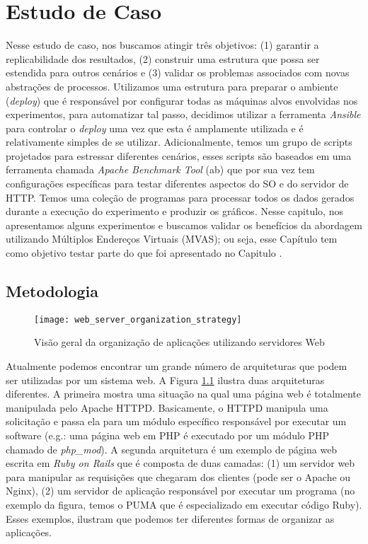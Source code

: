 \chapter{Estudo de Caso} \label{cap:estudo-de-caso}

Nesse estudo de caso, nos buscamos atingir três objetivos: (1) garantir a
replicabilidade dos resultados, (2) construir uma estrutura que possa ser
estendida para outros cenários e (3) validar os problemas associados com novas
abstrações de processos. Utilizamos uma estrutura para preparar o ambiente
(\emph{deploy}) que é responsável por configurar todas as máquinas alvos
envolvidas nos experimentos, para automatizar tal passo, decidimos utilizar a
ferramenta \emph{Ansible} para controlar o \emph{deploy} uma vez que esta é
amplamente utilizada e é relativamente simples de se utilizar. Adicionalmente,
temos um grupo de scripts projetados para estressar diferentes cenários, esses
scripts são baseados em uma ferramenta chamada \emph{Apache Benchmark Tool}
(ab) que por sua vez tem configurações específicas para testar diferentes
aspectos do SO e do servidor de HTTP. Temos uma coleção de programas para
processar todos os dados gerados durante a execução do experimento e produzir
os gráficos. Nesse capitulo, nos apresentamos alguns experimentos e buscamos
validar os benefícios da abordagem utilizando Múltiplos Endereços Virtuais
(MVAS); ou seja, esse Capítulo tem como objetivo testar parte do que foi
apresentado no Capitulo \label{cap:validacoes}.

\section{Metodologia} \label{sec:metodologia}

\begin{figure}[!h] \centering
\texttt{[image: web\_server\_organization\_strategy]}
\caption{Visão geral da organização de aplicações utilizando servidores Web}
\label{fig:web_server} \end{figure}

Atualmente podemos encontrar um grande número de arquiteturas que podem ser
utilizadas por um sistema web. A Figura \ref{fig:web_server} ilustra duas
arquiteturas diferentes. A primeira mostra uma situação na qual uma página web
é totalmente manipulada pelo Apache HTTPD. Basicamente, o HTTPD manipula uma
solicitação e passa ela para um módulo específico responsável por executar um
software (e.g.: uma página web em PHP é executado por um módulo PHP chamado de
\emph{php\_mod}). A segunda arquitetura é um exemplo de página web escrita em
\emph{Ruby on Rails} que é composta de duas camadas: (1) um servidor web para
manipular as requisições que chegaram dos clientes (pode ser o Apache ou
Nginx), (2) um servidor de aplicação responsável por executar um programa (no
exemplo da figura, temos o PUMA que é especializado em executar código Ruby).
Esses exemplos, ilustram que podemos ter diferentes formas de organizar as
aplicações.

